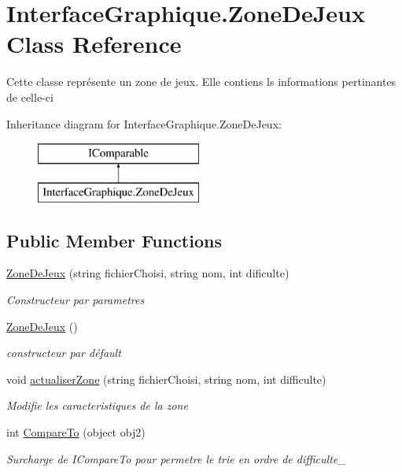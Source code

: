\hypertarget{class_interface_graphique_1_1_zone_de_jeux}{\section{Interface\-Graphique.\-Zone\-De\-Jeux Class Reference}
\label{class_interface_graphique_1_1_zone_de_jeux}
}


Cette classe représente un zone de jeux. Elle contiens ls informations pertinantes de celle-\/ci  


Inheritance diagram for Interface\-Graphique.\-Zone\-De\-Jeux\-:\begin{figure}[H]
\begin{center}
\leavevmode
\includegraphics[height=2.000000cm]{class_interface_graphique_1_1_zone_de_jeux}
\end{center}
\end{figure}
\subsection*{Public Member Functions}
\begin{DoxyCompactItemize}
\item 
\hyperlink{class_interface_graphique_1_1_zone_de_jeux_afbc2cbd18327b51da80c08ebe39f1101}{Zone\-De\-Jeux} (string fichier\-Choisi, string nom, int dificulte)
\begin{DoxyCompactList}\small\item\em Constructeur par parametres \end{DoxyCompactList}\item 
\hyperlink{class_interface_graphique_1_1_zone_de_jeux_acaa8405f5a257643abcc7adc1cc37295}{Zone\-De\-Jeux} ()
\begin{DoxyCompactList}\small\item\em constructeur par défault \end{DoxyCompactList}\item 
void \hyperlink{class_interface_graphique_1_1_zone_de_jeux_a06c81248cf3480b6ab3cb06fb22f33d8}{actualiser\-Zone} (string fichier\-Choisi, string nom, int difficulte)
\begin{DoxyCompactList}\small\item\em Modifie les caracteristiques de la zone \end{DoxyCompactList}\item 
int \hyperlink{class_interface_graphique_1_1_zone_de_jeux_af8418ecfcea244286b3cda1fc9d9a41f}{Compare\-To} (object obj2)
\begin{DoxyCompactList}\small\item\em Surcharge de I\-Compare\-To pour permetre le trie en ordre de difficulte\-\_\- \end{DoxyCompactList}\end{DoxyCompactItemize}
